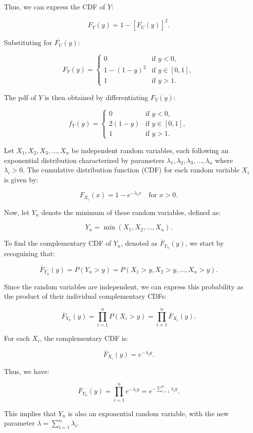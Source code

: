 \begin{example}
Thus, we can express the CDF of \( Y \):

\[
F_Y(y) = 1 - [\overline{F_U}(y)]^2.
\]

Substituting for \( \overline{F_U}(y) \):

\[
F_Y(y) =
\begin{cases}
0 & \text{if } y < 0, \\
1 - (1 - y)^2 & \text{if } y \in [0, 1], \\
1 & \text{if } y > 1.
\end{cases}
\]

The pdf of \( Y \) is then obtained by differentiating \( F_Y(y) \):

\[
f_Y(y) =
\begin{cases}
0 & \text{if } y < 0, \\
2(1 - y) & \text{if } y \in [0, 1], \\
1 & \text{if } y > 1.
\end{cases}
\]

\end{example}


\begin{example}
    Let \( X_1, X_2, X_3, \ldots, X_n \) be independent random variables, each following an exponential distribution characterized by parameters \( \lambda_1, \lambda_2, \lambda_3, \ldots, \lambda_n \) where \( \lambda_i > 0 \). The cumulative distribution function (CDF) for each random variable \( X_i \) is given by:

    \[
    F_{X_i}(x) = 1 - e^{-\lambda_i x} \quad \text{for } x > 0.
    \]
    
    Now, let \( Y_n \) denote the minimum of these random variables, defined as:
    
    \[
    Y_n = \min(X_1, X_2, \ldots, X_n).
    \]
    
    To find the complementary CDF of \( Y_n \), denoted as \( \overline{F}_{Y_n}(y) \), we start by recognizing that:
    
    \[
    \overline{F}_{Y_n}(y) = P(Y_n > y) = P(X_1 > y, X_2 > y, \ldots, X_n > y).
    \]
    
    Since the random variables are independent, we can express this probability as the product of their individual complementary CDFs:
    
    \[
    \overline{F}_{Y_n}(y) = \prod_{i=1}^{n} P(X_i > y) = \prod_{i=1}^{n} \overline{F}_{X_i}(y).
    \]
    
    For each \( X_i \), the complementary CDF is:
    
    \[
    \overline{F}_{X_i}(y) = e^{-\lambda_i y}.
    \]
    
    Thus, we have:
    
    \[
    \overline{F}_{Y_n}(y) = \prod_{i=1}^{n} e^{-\lambda_i y} = e^{-\sum_{i=1}^{n} \lambda_i y}.
    \]
    
    This implies that \( Y_n \) is also an exponential random variable, with the new parameter \( \lambda = \sum_{i=1}^{n} \lambda_i \). 
\end{example}


